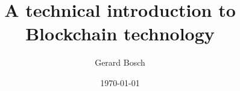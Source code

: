 \documentclass[notitlepage, usenames,dvipsnames]{beamer}
\title[Intro to Blockchain Technology]{A technical introduction to Blockchain technology}
\author[Gerard Bosch]{Gerard Bosch}
\institute{\email{gerard.bosch@gmail.com}}
\date{\today}
\newcommand{\st}{\structure}
\begin{document}

\end{document}

